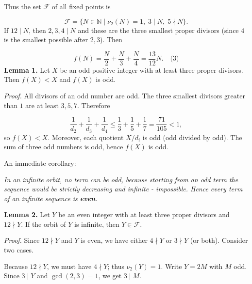 Thus the set \(\mathcal{F}\) of all fixed points is\par
\[
\boxed{\mathcal{F}=\bigl\{N\in\mathbb{N}\;\big|\; \nu_2(N)=1,\;3\mid N,\;5\nmid N\bigr\}.}
\]
\smallskip
{}
If \(12\mid N\), then \(2,3,4\mid N\) and these are the three smallest proper divisors (since \(4\) is the smallest possible after \(2,3\)). Then\par
\[
f(N)=\frac{N}{2}+\frac{N}{3}+\frac{N}{4}=\frac{13}{12}N. \quad\text{(3)}
\]
\smallskip
{}
\textbf{Lemma 1.} Let \(X\) be an odd positive integer with at least three proper divisors. Then \(f(X)<X\) and \(f(X)\) is odd.\par
\emph{Proof.} All divisors of an odd number are odd. The three smallest divisors greater than \(1\) are at least \(3,5,7\). Therefore\par
\[
\frac{1}{d_2}+\frac{1}{d_3}+\frac{1}{d_4}\le\frac{1}{3}+\frac{1}{5}+\frac{1}{7}=\frac{71}{105}<1,
\]
so \(f(X)<X\). Moreover, each quotient \(X/d_i\) is odd (odd divided by odd). The sum of three odd numbers is odd, hence \(f(X)\) is odd.\par
An immediate corollary:\par
\par\noindent\emph{In an infinite orbit, no term can be odd, because starting from an odd term the sequence would be strictly decreasing and infinite - impossible. Hence every term of an infinite sequence is \textbf{even}.}\par
\smallskip
{}
\textbf{Lemma 2.} Let \(Y\) be an even integer with at least three proper divisors and \(12\nmid Y\). If the orbit of \(Y\) is infinite, then \(Y\in\mathcal{F}\).\par
\emph{Proof.} Since \(12\nmid Y\) and \(Y\) is even, we have either \(4\nmid Y\) or \(3\nmid Y\) (or both). Consider two cases.\par
{}
Because \(12\nmid Y\), we must have \(4\nmid Y\); thus \(\nu_2(Y)=1\). Write \(Y=2M\) with \(M\) odd. Since \(3\mid Y\) and \(\gcd(2,3)=1\), we get \(3\mid M\).\par
